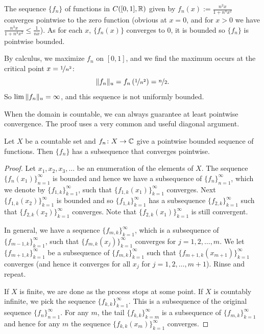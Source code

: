 \begin{example}
The sequence $\{ f_n \}$ of functions in $C([0,1],{\mathbb{R}})$ given by $f_n(x) :=
\frac{n^3x}{1+n^4x^2}$
converges pointwise to the zero function (obvious at $x=0$, and for $x > 0$
we have $\frac{n^3x}{1+n^4x^2} \leq \frac{1}{nx}$).
As for each $x$, $\{f_n(x)\}$ converges to 0, it is bounded
so $\{ f_n \}$ is pointwise bounded.

By calculus, we maximize $f_n$ on
$[0,1]$, and we find the maximum occurs at the critical point
$x=\nicefrac{1}{n^2}$:
\begin{equation*}
\lVert {f_n} \rVert_u
=
f_n\left(\nicefrac{1}{n^2}\right)
= \nicefrac{n}{2} .
\end{equation*}
So $\lim\, \lVert {f_n} \rVert_u = \infty$, and
this sequence is not uniformly bounded.
\end{example}

When the domain is countable, we can always guarantee at least pointwise
convergence.
The proof uses a very common and useful diagonal argument.

\begin{prop} \label{prop:subsequenceoncountableX}
Let $X$ be a countable set and $f_n \colon X \to {\mathbb{C}}$ give a pointwise bounded
sequence of functions.  Then $\{ f_n \}$ has a subsequence that converges
pointwise.
\end{prop}

\begin{proof}
Let $x_1,x_2,x_3,\ldots$ be an enumeration of the elements of $X$.
The sequence $\{ f_n(x_1) \}_{n=1}^\infty$ is bounded and hence
we have a subsequence of $\{ f_n \}_{n=1}^{\infty}$, which we denote by
$\{ f_{1,k} \}_{k=1}^\infty$,
such that
$\{ f_{1,k}(x_1) \}_{k=1}^\infty$ converges.
Next $\{ f_{1,k}(x_2) \}_{k=1}^\infty$ is bounded and so 
$\{ f_{1,k} \}_{k=1}^\infty$ has a subsequence
$\{ f_{2,k} \}_{k=1}^\infty$ such that
$\{ f_{2,k}(x_2) \}_{k=1}^\infty$ converges.  Note that
$\{ f_{2,k}(x_1) \}_{k=1}^\infty$ is still convergent.

In general, we have a sequence $\{ f_{m,k} \}_{k=1}^\infty$,
which is a subsequence of $\{ f_{m-1,k} \}_{k=1}^\infty$,
such that $\{ f_{m,k}(x_j) \}_{k=1}^\infty$ converges for $j=1,2,\ldots, m$.
We let $\{ f_{m+1,k} \}_{k=1}^\infty$ be a subsequence of
$\{ f_{m,k} \}_{k=1}^\infty$
such that
$\{ f_{m+1,k}(x_{m+1}) \}_{k=1}^\infty$ converges (and hence it converges for all
$x_j$ for $j=1,2,\ldots,m+1$).  Rinse and repeat.

If $X$ is finite, we are done as the process stops at some point.
If $X$ is countably infinite,
we pick the sequence
$\{ f_{k,k} \}_{k=1}^\infty$.
This is a subsequence of the original sequence $\{ f_n \}_{n=1}^\infty$.
For any $m$, the tail $\{ f_{k,k} \}_{k=m}^\infty$ is a subsequence of $\{ f_{m,k}
\}_{k=1}^\infty$
and hence for any $m$ the sequence $\{ f_{k,k}(x_m) \}_{k=1}^\infty$ converges.
\end{proof}

